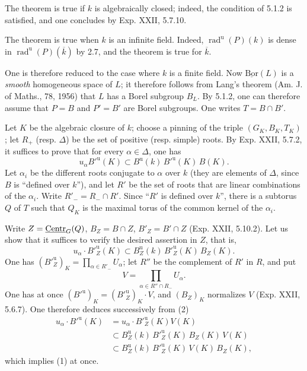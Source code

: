 \label{XXVI.5.1.3}
The theorem is true if $k$ is algebraically closed; indeed, the condition of 5.1.2 is satisfied, and one concludes by Exp. XXII, 5.7.10.

\label{XXVI.5.1.4}
The theorem is true when $k$ is an infinite field. Indeed, $\operatorname{rad}^{\mathrm u}(P)(k)$ is dense in $\operatorname{rad}^{\mathrm u}(P)(\overline{k})$ by 2.7, and the theorem is true for $\overline{k}$.

\label{XXVI.5.1.5}
One is therefore reduced to the case where $k$ is a finite field. Now $\underline{\mathrm{Bor}}(L)$ is a \emph{smooth} homogeneous space of $L$; it therefore follows from Lang's theorem (Am. J. of Maths., 78, 1956) that $L$ has a Borel subgroup $B_L$. By 5.1.2, one can therefore assume that $P=B$ and $P'=B'$ are Borel subgroups. One writes $T=B\cap B'$.

\label{XXVI.5.1.6}
Let $K$ be the algebraic closure of $k$; choose a pinning of the triple $(G_K,B_K,T_K)$; let $R_+$ (resp. $\Delta$) be the set of positive (resp. simple) roots. By Exp. XXII, 5.7.2, it suffices to prove that for every $\alpha\in\Delta$, one has
\begin{equation}\tag{1}
 u_\alpha B'^{\mathrm u}(K)\subset B^{\mathrm u}(k)\,B'^{\mathrm u}(K)\,B(K).
\end{equation}
Let $\alpha_i$ be the different roots conjugate to $\alpha$ over $k$ (they are elements of $\Delta$, since $B$ is ``defined over $k$''), and let $R'$ be the set of roots that are linear combinations of the $\alpha_i$. Write $R'_-=R_-\cap R'$. Since ``$R'$ is defined over $k$'', there is a subtorus $Q$ of $T$ such that $Q_K$ is the maximal torus of the common kernel of the $\alpha_i$.

Write $Z=\underline{\mathrm{Centr}}_G(Q)$, $B_Z=B\cap Z$, $B'_Z=B'\cap Z$ (\cf Exp. XXII, 5.10.2). Let us show that it suffices to verify the desired assertion in $Z$, that is,
\begin{equation}\tag{2}
 u_\alpha\cdot B'^{\mathrm u}_Z(K)\subset B^{\mathrm u}_Z(k)\,B'^{\mathrm u}_Z(K)\,B_Z(K).
\end{equation}
One has $(B'^{\mathrm u}_Z)_K=\prod_{\alpha\in R'_-}U_\alpha$; let $R''$ be the complement of $R'$ in $R$, and put
\[
 V=\prod_{\alpha\in R''\cap R_-}U_\alpha.
\]
One has at once $(B'^{\mathrm u})_K=(B'^{\mathrm u}_Z)_K\cdot V$, and $(B_Z)_K$ normalizes $V$ (Exp. XXII, 5.6.7). One therefore deduces successively from (2)
\[
\begin{aligned}
 u_\alpha\cdot B'^{\mathrm u}(K)
 &=u_\alpha\cdot B'^{\mathrm u}_Z(K)V(K)\\
 &\subset B^{\mathrm u}_Z(k)\,B'^{\mathrm u}_Z(K)\,B_Z(K)\,V(K)\\
 &\subset B^{\mathrm u}_Z(k)\,B'^{\mathrm u}_Z(K)\,V(K)\,B_Z(K),
\end{aligned}
\]
which implies (1) at once.

